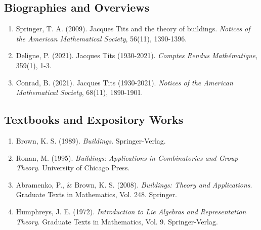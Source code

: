 \subsection*{Biographies and Overviews}
\begin{enumerate}
    \item Springer, T. A. (2009). Jacques Tits and the theory of buildings. \textit{Notices of the American Mathematical Society}, 56(11), 1390-1396.
    \item Deligne, P. (2021). Jacques Tits (1930-2021). \textit{Comptes Rendus Mathématique}, 359(1), 1-3.
    \item Conrad, B. (2021). Jacques Tits (1930-2021). \textit{Notices of the American Mathematical Society}, 68(11), 1890-1901.
\end{enumerate}

\subsection*{Textbooks and Expository Works}
\begin{enumerate}
    \item Brown, K. S. (1989). \textit{Buildings}. Springer-Verlag.
    \item Ronan, M. (1995). \textit{Buildings: Applications in Combinatorics and Group Theory}. University of Chicago Press.
    \item Abramenko, P., \& Brown, K. S. (2008). \textit{Buildings: Theory and Applications}. Graduate Texts in Mathematics, Vol. 248. Springer.
    \item Humphreys, J. E. (1972). \textit{Introduction to Lie Algebras and Representation Theory}. Graduate Texts in Mathematics, Vol. 9. Springer-Verlag.
\end{enumerate}
